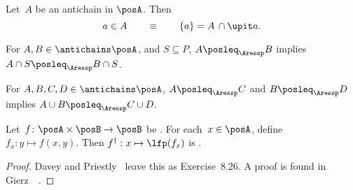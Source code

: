 \begin{lemma}
  \label{lem:antichain-write}Let~$A$ be an antichain in $\posA$.
  Then
  \[
    a\in A\qquad\equiv\qquad\{a\}=A\,\cap\upit a.
  \]
\end{lemma}

\begin{lemma}
  \label{lem:antichain_inter}For $A,B\in\antichains\posA$, and $S\subseteq P$,
  $A\posleq_{\Aressp}B$ implies $A\cap S\posleq_{\Aressp}B\cap S$.
\end{lemma}

\begin{lemma}
  \label{lem:antichain_union}For $A,B,C,D\in\antichains\posA$, $A\posleq_{\Aressp}C$
  and $B\posleq_{\Aressp}D$ implies $A\cup B\posleq_{\Aressp}C\cup D.$
\end{lemma}

\begin{lemma}
  \label{lem:dagger}Let~$f\colon\posA\times\posB\rightarrow\posB$
  be \scottcontinuous. For each~$x\in\posA$, define $f_{x}:y\mapsto f(x,y).$
  Then $f^{\dagger}:x\mapsto\lfp(f_{x})$ is \scottcontinuous.
\end{lemma}
\begin{proof}
  Davey and Priestly~\cite{davey02} leave this as Exercise~8.26.
  A proof is found in Gierz~\etal~\cite[Exercise II-2.29]{gierz03continuous}.
\end{proof}

